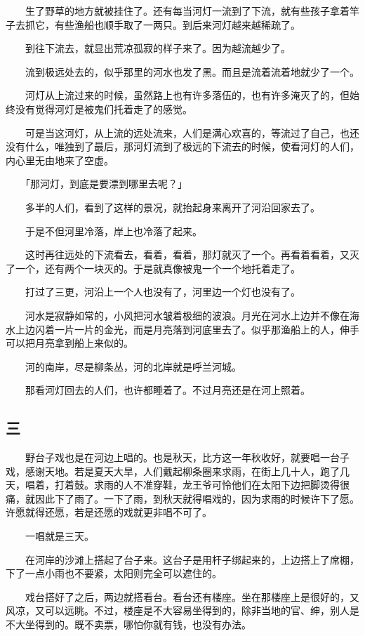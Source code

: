 \documentclass[UTF8]{ctexart}
\begin{document}
　　生了野草的地方就被挂住了。还有每当河灯一流到了下流，就有些孩子拿着竿子去抓它，有些渔船也顺手取了一两只。到后来河灯越来越稀疏了。

　　到往下流去，就显出荒凉孤寂的样子来了。因为越流越少了。

　　流到极远处去的，似乎那里的河水也发了黑。而且是流着流着地就少了一个。

　　河灯从上流过来的时候，虽然路上也有许多落伍的，也有许多淹灭了的，但始终没有觉得河灯是被鬼们托着走了的感觉。

　　可是当这河灯，从上流的远处流来，人们是满心欢喜的，等流过了自己，也还没有什么，唯独到了最后，那河灯流到了极远的下流去的时候，使看河灯的人们，内心里无由地来了空虚。

　　「那河灯，到底是要漂到哪里去呢？」

　　多半的人们，看到了这样的景况，就抬起身来离开了河沿回家去了。

　　于是不但河里冷落，岸上也冷落了起来。

　　这时再往远处的下流看去，看着，看着，那灯就灭了一个。再看着看着，又灭了一个，还有两个一块灭的。于是就真像被鬼一个一个地托着走了。

　　打过了三更，河沿上一个人也没有了，河里边一个灯也没有了。

　　河水是寂静如常的，小风把河水皱着极细的波浪。月光在河水上边并不像在海水上边闪着一片一片的金光，而是月亮落到河底里去了。似乎那渔船上的人，伸手可以把月亮拿到船上来似的。

　　河的南岸，尽是柳条丛，河的北岸就是呼兰河城。

　　那看河灯回去的人们，也许都睡着了。不过月亮还是在河上照着。

\subsection{三}

　　野台子戏也是在河边上唱的。也是秋天，比方这一年秋收好，就要唱一台子戏，感谢天地。若是夏天大旱，人们戴起柳条圈来求雨，在街上几十人，跑了几天，唱着，打着鼓。求雨的人不准穿鞋，龙王爷可怜他们在太阳下边把脚烫得很痛，就因此下了雨了。一下了雨，到秋天就得唱戏的，因为求雨的时候许下了愿。许愿就得还愿，若是还愿的戏就更非唱不可了。

　　一唱就是三天。

　　在河岸的沙滩上搭起了台子来。这台子是用杆子绑起来的，上边搭上了席棚，下了一点小雨也不要紧，太阳则完全可以遮住的。

　　戏台搭好了之后，两边就搭看台。看台还有楼座。坐在那楼座上是很好的，又风凉，又可以远眺。不过，楼座是不大容易坐得到的，除非当地的官、绅，别人是不大坐得到的。既不卖票，哪怕你就有钱，也没有办法。
\end{document}
